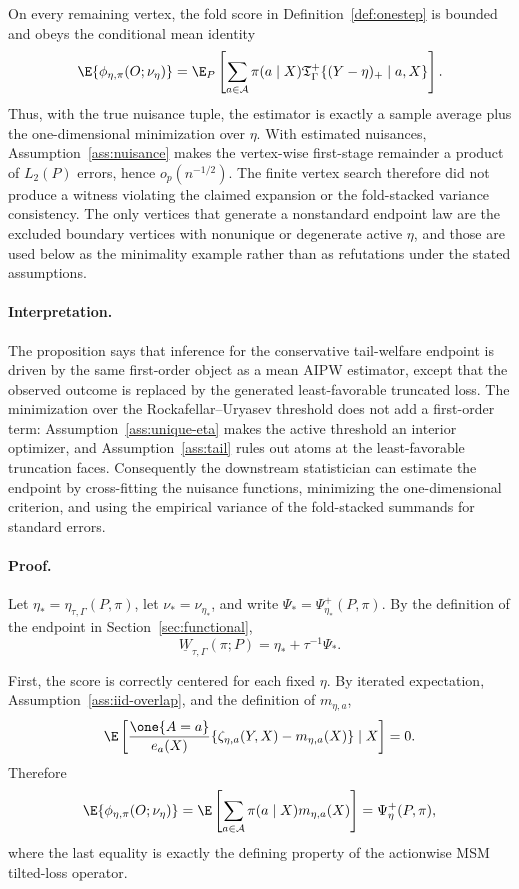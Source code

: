 On every remaining vertex, the fold score in Definition~\ref{def:onestep} is bounded and obeys the conditional mean identity
\[
\E\{\phi_{\eta,\pi}(O;\nu_\eta)\}
=
\E_P\left[
\sum_{a\in\mathcal A}\pi(a\mid X)
\mathfrak T_\Gamma^+\{(Y-\eta)_+\mid a,X\}
\right].
\]
Thus, with the true nuisance tuple, the estimator is exactly a sample average plus the one-dimensional minimization over \(\eta\).  With estimated nuisances, Assumption~\ref{ass:nuisance} makes the vertex-wise first-stage remainder a product of \(L_2(P)\) errors, hence \(o_p(n^{-1/2})\).  The finite vertex search therefore did not produce a witness violating the claimed expansion or the fold-stacked variance consistency.  The only vertices that generate a nonstandard endpoint law are the excluded boundary vertices with nonunique or degenerate active \(\eta\), and those are used below as the minimality example rather than as refutations under the stated assumptions.

\paragraph{Interpretation.}
The proposition says that inference for the conservative tail-welfare endpoint is driven by the same first-order object as a mean AIPW estimator, except that the observed outcome is replaced by the generated least-favorable truncated loss.  The minimization over the Rockafellar--Uryasev threshold does not add a first-order term: Assumption~\ref{ass:unique-eta} makes the active threshold an interior optimizer, and Assumption~\ref{ass:tail} rules out atoms at the least-favorable truncation faces.  Consequently the downstream statistician can estimate the endpoint by cross-fitting the nuisance functions, minimizing the one-dimensional criterion, and using the empirical variance of the fold-stacked summands for standard errors.

\paragraph{Proof.}
Let \(\eta_*=\eta_{\tau,\Gamma}(P,\pi)\), let \(\nu_*=\nu_{\eta_*}\), and write
\(\Psi_*=\Psi_{\eta_*}^{+}(P,\pi)\).  By the definition of the endpoint in
Section~\ref{sec:functional},
\[
\underline W_{\tau,\Gamma}(\pi;P)=\eta_*+\tau^{-1}\Psi_*.
\]

First, the score is correctly centered for each fixed \(\eta\).  By iterated expectation, Assumption~\ref{ass:iid-overlap}, and the definition of \(m_{\eta,a}\),
\[
\E\left[
\frac{\one\{A=a\}}{e_a(X)}
\{\zeta_{\eta,a}(Y,X)-m_{\eta,a}(X)\}
\mid X
\right]=0.
\]
Therefore
\[
\E\{\phi_{\eta,\pi}(O;\nu_\eta)\}
=
\E\left[
\sum_{a\in\mathcal A}\pi(a\mid X)m_{\eta,a}(X)
\right]
=\Psi_\eta^{+}(P,\pi),
\]
where the last equality is exactly the defining property of the actionwise MSM tilted-loss operator.

